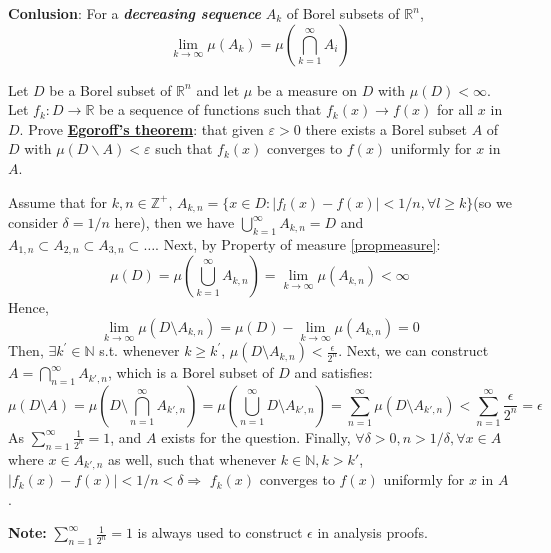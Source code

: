 \documentclass[12pt, a4paper]{article}
\begin{document}
\textbf{Conlusion}: For a \textbf{\textit{decreasing sequence}} $A_k$ of Borel subsets of $\mathbb{R}^n$, 
$$\displaystyle \lim_{k\rightarrow \infty} \mu(A_k) = \mu(\bigcap_{k=1}^{\infty} A_{i})$$


\begin{customexercise}{1.23}
    Let $D$ be a Borel subset of $\mathbb{R}^{n}$ and let $\mu$ be a measure 
    on $D$ with $\mu(D)<\infty$. Let $f_{k}: D \rightarrow \mathbb{R}$ be a 
    sequence of functions such that $f_{k}(x) \rightarrow f(x)$ for all $x$ 
    in $D$. Prove \underline{\textbf{Egoroff's theorem}}: that given $\varepsilon>0$ there exists 
    a Borel subset $A$ of $D$ with $\mu(D \backslash A)<\varepsilon$ such that 
    $f_{k}(x)$ converges to $f(x)$ uniformly for $x$ in $A$.
\end{customexercise}

\begin{customsol}{1.23} 
    Assume that for $k, n \in \mathbb{Z}^+$, $A_{k, n} = \{x\in D: |f_l(x) - f(x)| < 1/n, \forall l\geq k\}$(so we consider $\delta = 1/n$ here), 
    then we have $\displaystyle \bigcup_{k=1}^\infty A_{k, n} = D$ and 
    $A_{1, n}\subset A_{2, n}\subset A_{3, n}\subset\dots$. Next, by Property of measure \ref{propmeasure}:
    $$\displaystyle \mu(D) = \mu(\bigcup_{k=1}^\infty A_{k,n}) = \lim_{k\rightarrow\infty}\mu(A_{k,n})<\infty$$
    Hence, 
    $$\displaystyle \lim_{k\rightarrow\infty}\mu(D\setminus A_{k,n}) = \mu(D) - \lim_{k\rightarrow\infty} \mu(A_{k, n}) = 0$$
    Then, $\exists k^\prime \in \mathbb{N}$  s.t. whenever 
    $k\geq k^\prime$, $\mu(D\setminus A_{k,n}) < \displaystyle \frac{\epsilon}{2^n}$. 
    Next, we can construct $\displaystyle A = \bigcap_{n = 1}^\infty A_{k',n}$, which is a Borel subset of $D$ and satisfies:
    $$\mu(D\setminus A) = \mu(D\setminus \bigcap_{n=1}^\infty A_{k', n}) = \mu(\bigcup_{n=1}^\infty D\setminus A_{k',n}) = \sum_{n=1}^\infty \mu(D\setminus A_{k',n}) < \sum_{n=1}^\infty \frac{\epsilon}{2^n} = \epsilon$$
    As $\displaystyle \sum_{n=1}^{\infty} \frac{1}{2^n} = 1$, and $A$ exists for the question. 
    Finally, $\forall\delta > 0, n > 1/\delta, \forall x\in A$ where $x\in A_{k', n}$ as well, such that whenever $k\in\mathbb{N}, k>k'$, $|f_k(x) - f(x)| < 1/n < \delta\Rightarrow$ $f_k(x)$ converges to $f(x)$ uniformly for $x$ in $A$.
    
    \end{customsol}

\textbf{Note: }$\displaystyle \sum_{n=1}^{\infty} \frac{1}{2^n} = 1$ is always used to construct $\epsilon$ in analysis proofs.
 
\end{document}
